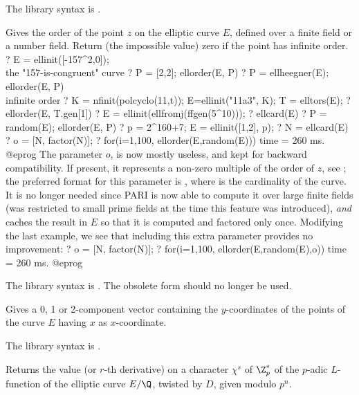 The library syntax is .

\label{se:ellorder}
Gives the order of the point $z$ on the elliptic
curve $E$, defined over a finite field or a number field.
Return (the impossible value) zero if the point has infinite order.
\bprog
? E = ellinit([-157^2,0]);  \\ the "157-is-congruent" curve
? P = [2,2]; ellorder(E, P)
? P = ellheegner(E); ellorder(E, P) \\ infinite order
? K = nfinit(polcyclo(11,t)); E=ellinit("11a3", K); T = elltors(E);
? ellorder(E, T.gen[1])
? E = ellinit(ellfromj(ffgen(5^10)));
? ellcard(E)
? P = random(E); ellorder(E, P)
? p = 2^160+7; E = ellinit([1,2], p);
? N = ellcard(E)
? o = [N, factor(N)];
? for(i=1,100, ellorder(E,random(E)))
time = 260 ms.
@eprog
The parameter $o$, is now mostly useless, and kept for backward
compatibility. If present, it represents a non-zero multiple of the order
of $z$, see ; the preferred format for this parameter is
, where  is the cardinality of the curve.
It is no longer needed since PARI is now able to compute it over large
finite fields (was restricted to small prime fields at the time this feature
was introduced), \emph{and} caches the result in $E$ so that it is computed
and factored only once. Modifying the last example, we see that including
this extra parameter provides no improvement:
\bprog
? o = [N, factor(N)];
? for(i=1,100, ellorder(E,random(E),o))
time = 260 ms.
@eprog

The library syntax is .
The obsolete form  should no longer be
used.

\label{se:ellordinate}
Gives a 0, 1 or 2-component vector containing
the $y$-coordinates of the points of the curve $E$ having $x$ as
$x$-coordinate.

The library syntax is .

\label{se:ellpadicL}
Returns the value (or $r$-th derivative) on a character $\chi^s$ of
$\Z_p^*$ of the $p$-adic $L$-function of the elliptic curve $E/\Q$, twisted by
$D$, given modulo $p^n$.

